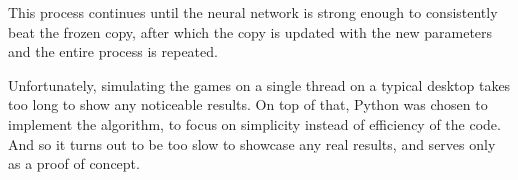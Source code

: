 \documentclass[11pt]{article}
\begin{document}
This process continues until the neural network is strong enough to
consistently beat the frozen copy, after which the copy is updated with the new
parameters and the entire process is repeated.

Unfortunately, simulating the games on a single thread on a typical desktop
takes too long to show any noticeable results. On top of that, Python was
chosen to implement the algorithm, to focus on simplicity instead of efficiency
of the code. And so it turns out to be too slow to showcase any real results,
and serves only as a proof of concept.
\end{document}
